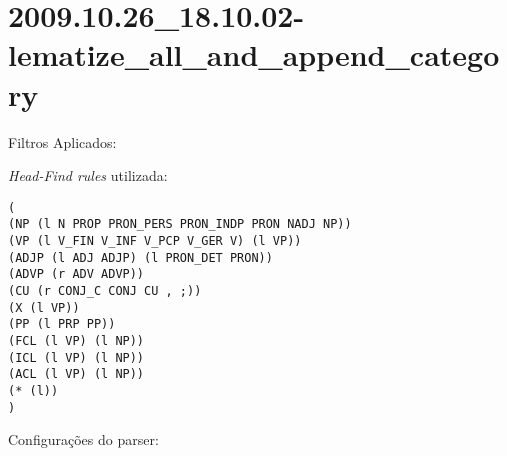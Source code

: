 \section{2009.10.26_18.10.02-lematize_all_and_append_category} %
\label{sec:exp:2009.10.26_18.10.02-lematize_all_and_append_category}

Filtros Aplicados:

\begin{itemize}
  
  \item{\emph{LematizeAllAndAppendCategory}
  
\end{itemize}

\emph{Head-Find rules} utilizada:

\scriptsize
\begin{verbatim}
(
(NP (l N PROP PRON_PERS PRON_INDP PRON NADJ NP))
(VP (l V_FIN V_INF V_PCP V_GER V) (l VP))
(ADJP (l ADJ ADJP) (l PRON_DET PRON))
(ADVP (r ADV ADVP))
(CU (r CONJ_C CONJ CU , ;))
(X (l VP))
(PP (l PRP PP))
(FCL (l VP) (l NP))
(ICL (l VP) (l NP))
(ACL (l VP) (l NP))
(* (l))
)

\end{verbatim}

\normalsize

Configurações do parser:

